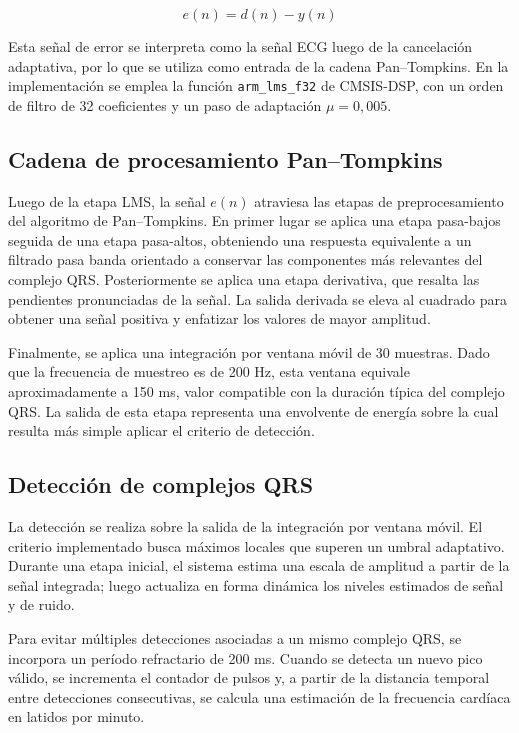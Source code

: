 \documentclass[12pt]{article}
\begin{document}
		\[
		e(n)=d(n)-y(n)
		\]

		Esta señal de error se interpreta como la señal ECG luego de la cancelación adaptativa, por lo que se utiliza como entrada de la cadena Pan--Tompkins. En la implementación se emplea la función \texttt{arm\_lms\_f32} de CMSIS-DSP, con un orden de filtro de 32 coeficientes y un paso de adaptación $\mu = 0{,}005$.

		\subsection{Cadena de procesamiento Pan--Tompkins}

		Luego de la etapa LMS, la señal $e(n)$ atraviesa las etapas de preprocesamiento del algoritmo de Pan--Tompkins. En primer lugar se aplica una etapa pasa-bajos seguida de una etapa pasa-altos, obteniendo una respuesta equivalente a un filtrado pasa banda orientado a conservar las componentes más relevantes del complejo QRS. Posteriormente se aplica una etapa derivativa, que resalta las pendientes pronunciadas de la señal. La salida derivada se eleva al cuadrado para obtener una señal positiva y enfatizar los valores de mayor amplitud.

		Finalmente, se aplica una integración por ventana móvil de 30 muestras. Dado que la frecuencia de muestreo es de 200 Hz, esta ventana equivale aproximadamente a 150 ms, valor compatible con la duración típica del complejo QRS. La salida de esta etapa representa una envolvente de energía sobre la cual resulta más simple aplicar el criterio de detección.

		\subsection{Detección de complejos QRS}

		La detección se realiza sobre la salida de la integración por ventana móvil. El criterio implementado busca máximos locales que superen un umbral adaptativo. Durante una etapa inicial, el sistema estima una escala de amplitud a partir de la señal integrada; luego actualiza en forma dinámica los niveles estimados de señal y de ruido.

		Para evitar múltiples detecciones asociadas a un mismo complejo QRS, se incorpora un período refractario de 200 ms. Cuando se detecta un nuevo pico válido, se incrementa el contador de pulsos y, a partir de la distancia temporal entre detecciones consecutivas, se calcula una estimación de la frecuencia cardíaca en latidos por minuto.
\end{document}
